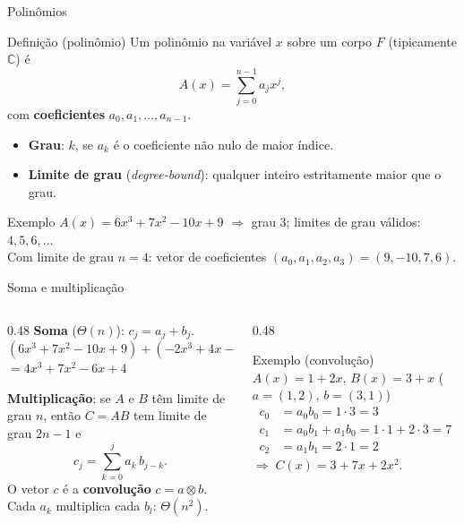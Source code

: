 \documentclass[aspectratio=169,10pt]{beamer}
\begin{document}
\begin{frame}{Polinômios}
  \begin{block}{Definição (polinômio)}
    Um polinômio na variável $x$ sobre um corpo $F$ (tipicamente $\mathbb{C}$) é
    \[
      A(x) = \sum_{j=0}^{n-1} a_j x^j,
    \]
    com \textbf{coeficientes} $a_0,a_1,\dots,a_{n-1}$.
    \begin{itemize}
      \item \textbf{Grau}: $k$, se $a_k$ é o coeficiente não nulo de maior índice.
      \item \textbf{Limite de grau} (\textit{degree-bound}): qualquer inteiro
            \alert{estritamente maior} que o grau.
    \end{itemize}
  \end{block}
  \begin{exampleblock}{Exemplo}
    $A(x) = 6x^3 + 7x^2 - 10x + 9$ \;$\Rightarrow$\; grau $3$; \;
    limites de grau válidos: $4, 5, 6, \dots$\\
    Com limite de grau $n=4$: vetor de coeficientes $(a_0,a_1,a_2,a_3) = (9,-10,7,6)$.
  \end{exampleblock}
\end{frame}

\begin{frame}{Soma e multiplicação}
  \begin{columns}[T]
    \begin{column}{0.48\textwidth}
      \textbf{Soma} ($\Theta(n)$): $c_j = a_j + b_j$.\\[3pt]
      {\small $(6x^3+7x^2-10x+9) + (-2x^3+4x-5)$\\
      $= 4x^3+7x^2-6x+4$}

      \vspace{8pt}
      \textbf{Multiplicação}: se $A$ e $B$ têm limite de grau $n$, então
      $C=AB$ tem limite de grau $2n-1$ e
      \[
        c_j = \sum_{k=0}^{j} a_k\, b_{j-k}.
      \]
      O vetor $c$ é a \textbf{convolução} $c = a \otimes b$.\\
      Cada $a_k$ multiplica cada $b_l$: \alert{$\Theta(n^2)$}.
    \end{column}
    \begin{column}{0.48\textwidth}
      \begin{exampleblock}{Exemplo (convolução)}
        $A(x) = 1 + 2x$, \; $B(x) = 3 + x$ \;\; ($a=(1,2)$, $b=(3,1)$)
        \begin{align*}
          c_0 &= a_0b_0 = 1\cdot 3 = 3\\
          c_1 &= a_0b_1 + a_1b_0 = 1\cdot1 + 2\cdot3 = 7\\
          c_2 &= a_1b_1 = 2\cdot1 = 2
        \end{align*}
        $\Rightarrow\; C(x) = 3 + 7x + 2x^2$.
      \end{exampleblock}
    \end{column}
  \end{columns}
\end{frame}
\end{document}
